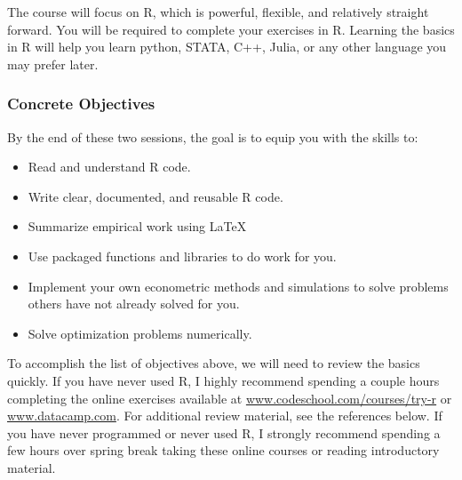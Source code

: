 \documentclass{scrartcl}
\begin{document}
The course will focus on R, which is powerful, flexible, and relatively straight forward. You will be required to complete your exercises in R. Learning the basics in R will help you learn python, STATA, C++, Julia, or any other language you may prefer later.

\subsubsection*{Concrete Objectives}



By the end of these two sessions, the goal is to equip you with the skills to:
\begin{itemize}
\item Read and understand R code.
\item Write clear, documented, and reusable R code.
\item Summarize empirical work using \LaTeX
\item Use packaged functions and libraries to do work for you.
\item Implement your own econometric methods and simulations to solve problems others have not already solved for you.
\item Solve optimization problems numerically. 
\end{itemize}

To accomplish the list of objectives above, we will need to review the basics quickly. If you have never used R, I highly recommend spending a couple hours completing the online exercises available at \href{www.codeschool.com/courses/try-r}{www.codeschool.com/courses/try-r} or  \href{www.datacamp.com}{www.datacamp.com}. For additional review material, see the references below. If you have never programmed or never used R, I strongly recommend spending a few hours over spring break taking these online courses or reading introductory material. 
\end{document}

